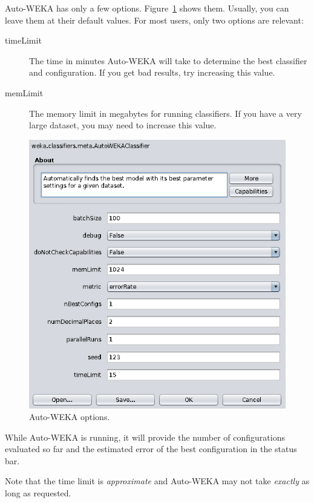 \documentclass{article}
\begin{document}
Auto-WEKA has only a few options. Figure~\ref{fig:options} shows them. Usually,
you can leave them at their default values. For most users, only two options are
relevant:
\begin{description}
\item[timeLimit] The time in minutes Auto-WEKA will take to determine the best
classifier and configuration. If you get bad results, try increasing this value.
\item[memLimit] The memory limit in megabytes for running classifiers. If you
have a very large dataset, you may need to increase this value.
\end{description}

\begin{figure}[!ht]
\begin{center}
\includegraphics[width=\textwidth]{options}
\caption{Auto-WEKA options.}
\label{fig:options}
\end{center}
\end{figure}

While Auto-WEKA is running, it will provide the number of configurations
evaluated so far and the estimated error of the best configuration in the status
bar.

\medskip

Note that the time limit is \emph{approximate} and Auto-WEKA may not take
\emph{exactly} as long as requested.
\end{document}
